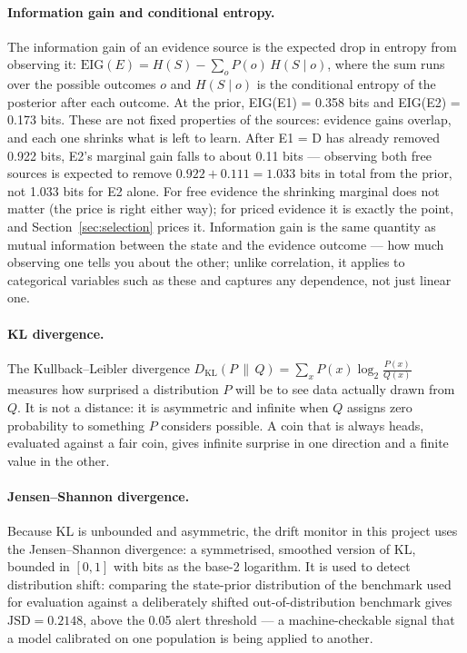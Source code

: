 \documentclass{article}
\begin{document}
\paragraph{Information gain and conditional entropy.} The information gain of an evidence source is the expected drop in entropy from observing it:
$\mathrm{EIG}(E) = H(S) - \sum_o P(o)\, H(S \mid o)$,
where the sum runs over the possible outcomes $o$ and $H(S \mid o)$ is the conditional entropy of the posterior after each outcome. At the prior, EIG(E1) = 0.358 bits and EIG(E2) = 0.173 bits. These are not fixed properties of the sources: evidence gains overlap, and each one shrinks what is left to learn. After E1 = D has already removed 0.922 bits, E2's marginal gain falls to about 0.11 bits --- observing both free sources is expected to remove $0.922 + 0.111 = 1.033$ bits in total from the prior, not 1.033 bits for E2 alone. For free evidence the shrinking marginal does not matter (the price is right either way); for priced evidence it is exactly the point, and Section~\ref{sec:selection} prices it. Information gain is the same quantity as mutual information between the state and the evidence outcome --- how much observing one tells you about the other; unlike correlation, it applies to categorical variables such as these and captures any dependence, not just linear one.

\paragraph{KL divergence.} The Kullback--Leibler divergence $D_{\mathrm{KL}}(P \,\|\, Q) = \sum_x P(x) \log_2 \frac{P(x)}{Q(x)}$ measures how surprised a distribution $P$ will be to see data actually drawn from $Q$. It is not a distance: it is asymmetric and infinite when $Q$ assigns zero probability to something $P$ considers possible. A coin that is always heads, evaluated against a fair coin, gives infinite surprise in one direction and a finite value in the other.

\paragraph{Jensen--Shannon divergence.} Because KL is unbounded and asymmetric, the drift monitor in this project uses the Jensen--Shannon divergence: a symmetrised, smoothed version of KL, bounded in $[0, 1]$ with bits as the base-2 logarithm. It is used to detect distribution shift: comparing the state-prior distribution of the benchmark used for evaluation against a deliberately shifted out-of-distribution benchmark gives $\mathrm{JSD} = 0.2148$, above the 0.05 alert threshold --- a machine-checkable signal that a model calibrated on one population is being applied to another.
\end{document}
